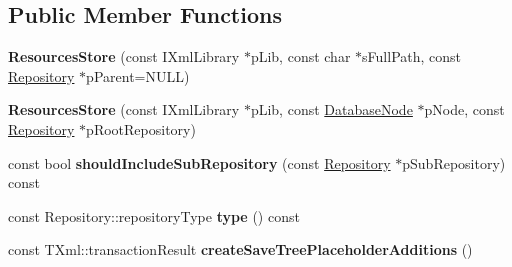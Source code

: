 \subsection*{\-Public \-Member \-Functions}
\begin{DoxyCompactItemize}
\item 
\hypertarget{classgeneral__server_1_1ResourcesStore_ae62bbd7a5da538612f35409fb17a4bf1}{{\bfseries \-Resources\-Store} (const \-I\-Xml\-Library $\ast$p\-Lib, const char $\ast$s\-Full\-Path, const \hyperlink{classgeneral__server_1_1Repository}{\-Repository} $\ast$p\-Parent=\-N\-U\-L\-L)}\label{classgeneral__server_1_1ResourcesStore_ae62bbd7a5da538612f35409fb17a4bf1}

\item 
\hypertarget{classgeneral__server_1_1ResourcesStore_a8736ed00822d31ee0230819182582e16}{{\bfseries \-Resources\-Store} (const \-I\-Xml\-Library $\ast$p\-Lib, const \hyperlink{classgeneral__server_1_1DatabaseNode}{\-Database\-Node} $\ast$p\-Node, const \hyperlink{classgeneral__server_1_1Repository}{\-Repository} $\ast$p\-Root\-Repository)}\label{classgeneral__server_1_1ResourcesStore_a8736ed00822d31ee0230819182582e16}

\item 
\hypertarget{classgeneral__server_1_1ResourcesStore_a5c2ff0cf6562642787ecd99486c4cd7c}{const bool {\bfseries should\-Include\-Sub\-Repository} (const \hyperlink{classgeneral__server_1_1Repository}{\-Repository} $\ast$p\-Sub\-Repository) const }\label{classgeneral__server_1_1ResourcesStore_a5c2ff0cf6562642787ecd99486c4cd7c}

\item 
\hypertarget{classgeneral__server_1_1ResourcesStore_a9677194943bda86395da6fa60467bf97}{const \-Repository\-::repository\-Type {\bfseries type} () const }\label{classgeneral__server_1_1ResourcesStore_a9677194943bda86395da6fa60467bf97}

\item 
\hypertarget{classgeneral__server_1_1ResourcesStore_a6450fe24ee717f1cb3f167722a8f3dbb}{const \-T\-Xml\-::transaction\-Result {\bfseries create\-Save\-Tree\-Placeholder\-Additions} ()}\label{classgeneral__server_1_1ResourcesStore_a6450fe24ee717f1cb3f167722a8f3dbb}

\end{DoxyCompactItemize}
